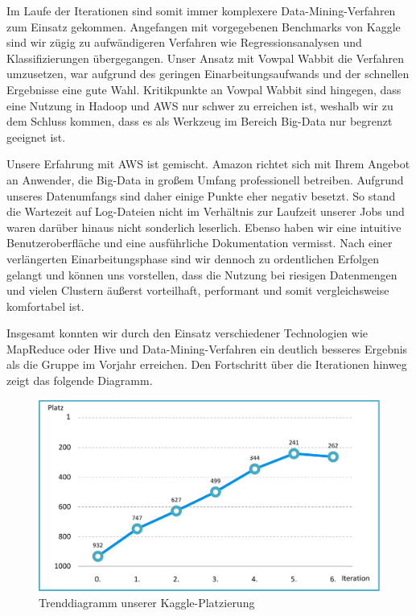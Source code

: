 Im Laufe der Iterationen sind somit immer komplexere Data-Mining-Verfahren zum Einsatz gekommen. Angefangen mit vorgegebenen Benchmarks von Kaggle sind wir zügig zu aufwändigeren Verfahren wie Regressionsanalysen und Klassifizierungen übergegangen. Unser Ansatz mit Vowpal Wabbit die Verfahren umzusetzen, war aufgrund des geringen Einarbeitungsaufwands und der schnellen Ergebnisse eine gute Wahl. Kritikpunkte an Vowpal Wabbit sind hingegen, dass eine Nutzung in Hadoop und AWS nur schwer zu erreichen ist, weshalb wir zu dem Schluss kommen, dass es als Werkzeug im Bereich Big-Data nur begrenzt geeignet ist.

Unsere Erfahrung mit AWS ist gemischt. Amazon richtet sich mit Ihrem Angebot an Anwender, die Big-Data in großem Umfang professionell betreiben. Aufgrund unseres Datenumfangs sind daher einige Punkte eher negativ besetzt. So stand die Wartezeit auf Log-Dateien nicht im Verhältnis zur Laufzeit unserer Jobs und waren darüber hinaus nicht sonderlich leserlich. Ebenso haben wir eine intuitive Benutzeroberfläche und eine ausführliche Dokumentation vermisst. Nach einer verlängerten Einarbeitungsphase sind wir dennoch zu ordentlichen Erfolgen gelangt und können uns vorstellen, dass die Nutzung bei riesigen Datenmengen und vielen Clustern äußerst vorteilhaft, performant und somit vergleichsweise komfortabel ist.

Insgesamt konnten wir durch den Einsatz verschiedener Technologien wie MapReduce oder Hive und Data-Mining-Verfahren ein deutlich besseres Ergebnis als die Gruppe im Vorjahr erreichen. Den Fortschritt über die Iterationen hinweg zeigt das folgende Diagramm.

\begin{figure}[H]
\centering
\includegraphics[width=0.85\linewidth]{Bilder/Trenddiagramm_Platzierungen}
\caption{Trenddiagramm unserer Kaggle-Platzierung}
\label{fig:Trenddiagramm_Platzierungen}
\end{figure}

